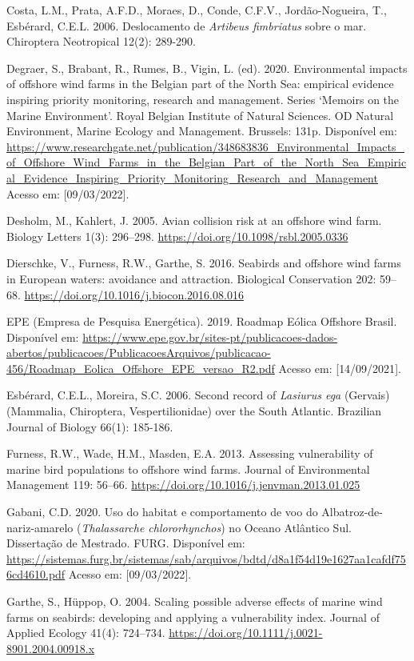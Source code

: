 \documentclass[
  oneside]{scrbook}
\begin{document}
Costa, L.M., Prata, A.F.D., Moraes, D., Conde, C.F.V., Jordão-Nogueira, T., Esbérard, C.E.L. 2006. Deslocamento de \emph{Artibeus fimbriatus} sobre o mar. Chiroptera Neotropical 12(2): 289-290.

Degraer, S., Brabant, R., Rumes, B., Vigin, L. (ed). 2020. Environmental impacts of offshore wind farms in the Belgian part of the North Sea: empirical evidence inspiring priority monitoring, research and management. Series `Memoirs on the Marine Environment'. Royal Belgian Institute of Natural Sciences. OD Natural Environment, Marine Ecology and Management. Brussels: 131p. Disponível em: \url{https://www.researchgate.net/publication/348683836_Environmental_Impacts_of_Offshore_Wind_Farms_in_the_Belgian_Part_of_the_North_Sea_Empirical_Evidence_Inspiring_Priority_Monitoring_Research_and_Management} Acesso em: {[}09/03/2022{]}.

Desholm, M., Kahlert, J. 2005. Avian collision risk at an offshore wind farm. Biology Letters 1(3): 296--298. \url{https://doi.org/10.1098/rsbl.2005.0336}

Dierschke, V., Furness, R.W., Garthe, S. 2016. Seabirds and offshore wind farms in European waters: avoidance and attraction. Biological Conservation 202: 59--68. \url{https://doi.org/10.1016/j.biocon.2016.08.016}

EPE (Empresa de Pesquisa Energética). 2019. Roadmap Eólica Offshore Brasil. Disponível em: \url{https://www.epe.gov.br/sites-pt/publicacoes-dados-abertos/publicacoes/PublicacoesArquivos/publicacao-456/Roadmap_Eolica_Offshore_EPE_versao_R2.pdf} Acesso em: {[}14/09/2021{]}.

Esbérard, C.E.L., Moreira, S.C. 2006. Second record of \emph{Lasiurus ega} (Gervais) (Mammalia, Chiroptera, Vespertilionidae) over the South Atlantic. Brazilian Journal of Biology 66(1): 185-186.

Furness, R.W., Wade, H.M., Masden, E.A. 2013. Assessing vulnerability of marine bird populations to offshore wind farms. Journal of Environmental Management 119: 56--66. \url{https://doi.org/10.1016/j.jenvman.2013.01.025}

Gabani, C.D. 2020. Uso do habitat e comportamento de voo do Albatroz-de-nariz-amarelo (\emph{Thalassarche chlororhynchos}) no Oceano Atlântico Sul. Dissertação de Mestrado. FURG. Disponível em: \url{https://sistemas.furg.br/sistemas/sab/arquivos/bdtd/d8a1f54d19e1627aa1cafdf756cd4610.pdf} Acesso em: {[}09/03/2022{]}.

Garthe, S., Hüppop, O. 2004. Scaling possible adverse effects of marine wind farms on seabirds: developing and applying a vulnerability index. Journal of Applied Ecology 41(4): 724--734. \url{https://doi.org/10.1111/j.0021-8901.2004.00918.x}
\end{document}
